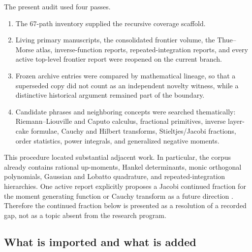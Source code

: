 \documentclass[11pt,oneside]{article}
\numberwithin{equation}{section}
\theoremstyle{definition}
\theoremstyle{remark}
\begin{document}
The present audit used four passes.
\begin{enumerate}
\item The 67-path inventory supplied the recursive coverage scaffold.
\item Living primary manuscripts, the consolidated frontier volume, the
      Thue--Morse atlas, inverse-function reports, repeated-integration reports,
      and every active top-level frontier report were reopened on the current
      branch.
\item Frozen archive entries were compared by mathematical lineage, so that a
      superseded copy did not count as an independent novelty witness, while a
      distinctive historical argument remained part of the boundary.
\item Candidate phrases and neighboring concepts were searched thematically:
      Riemann--Liouville and Caputo calculus, fractional primitives, inverse
      layer-cake formulae, Cauchy and Hilbert transforms, Stieltjes/Jacobi
      fractions, order statistics, power integrals, and generalized negative
      moments.
\end{enumerate}

This procedure located substantial adjacent work.  In particular, the corpus
already contains rational up-moments, Hankel determinants, monic orthogonal
polynomials, Gaussian and Lobatto quadrature, and repeated-integration
hierarchies.  One active report explicitly proposes a Jacobi continued fraction
for the moment generating function or Cauchy transform as a future direction
\cite{proveitQuadrature}.  Therefore the continued fraction below is presented
as a resolution of a recorded gap, not as a topic absent from the research
program.

\subsection{What is imported and what is added}
\end{document}
